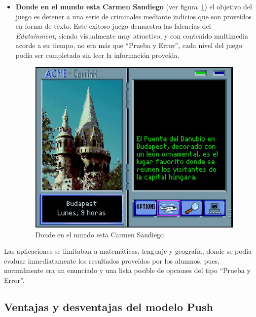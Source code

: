 \begin{itemize}
\begin{itemize}
    \item \textbf{Donde en el mundo esta Carmen Sandiego} (ver
        figura~\ref{fig:carmen}) el objetivo del juego es detener a una serie de
        criminales mediante indicios que son proveídos en forma de texto. Este
        exitoso juego demuestra las falencias del \textit{Edutainment}, siendo
        visualmente muy atractivo, y con contenido multimedia acorde a su
        tiempo, no era más que \enquote{Prueba y Error}, cada nivel del juego
        podía ser completado sin leer la información
        proveída\cite{charsky:2010}.

        \begin{figure}[ht!] 
        \centering 
        \includegraphics[scale=0.5]{tics/images/carmen.jpg}
        \caption{Donde en el mundo esta Carmen Sandiego}\label{fig:carmen}
        \end{figure}

    \end{itemize}

    Las aplicaciones se limitaban a matemáticas, lenguaje y geografía, donde se
    podía evaluar inmediatamente los resultados proveídos por los alumnos, pues,
    normalmente era un enunciado y una lista posible de opciones del tipo
    \enquote{Prueba y Error}\cite{leinonen:ict}. 

\end{itemize}

\subsection{Ventajas y desventajas del modelo Push}

